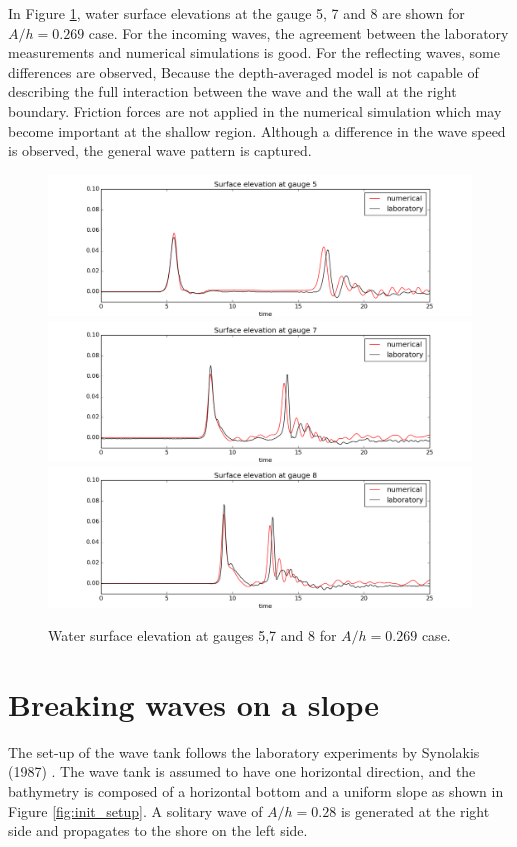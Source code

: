 \documentclass[review]{elsarticle}
\begin{document}
In Figure \ref{fig:bp5b_gauges}, water surface elevations
at the gauge 5, 7 and 8 are shown for $A/h=0.269$ case. 
For the incoming waves, the agreement 
between the laboratory measurements and numerical simulations is good. 
For the reflecting waves, some differences are observed,
Because the depth-averaged model is not capable 
of describing the full interaction between the wave and the wall
at the right boundary. 
Friction forces are not applied in the numerical simulation
which may become important at the shallow region. 
Although a difference in the wave speed is observed,
the general wave pattern is captured. 

\begin{figure}[!htb]
\centering
\includegraphics[width=.8\textwidth]{_fig/gauge0005fig300.png}\\
\includegraphics[width=.8\textwidth]{_fig/gauge0007fig300.png}\\
\includegraphics[width=.8\textwidth]{_fig/gauge0008fig300.png}
\caption{Water surface elevation at gauges 5,7 and 8 for $A/h=0.269$ case.}
\label{fig:bp5b_gauges}
\end{figure}

\section{Breaking waves on a slope}

The set-up of the wave tank follows 
the laboratory experiments by Synolakis (1987) \citep{synolakis1987runup}. 
The wave tank is assumed to have one horizontal direction,
and the bathymetry is composed of a horizontal bottom and 
a uniform slope as shown in Figure \ref{fig:init_setup}. 
A solitary wave of $A/h=0.28$ is generated at the right side
and propagates to the shore on the left side. 
\end{document}
